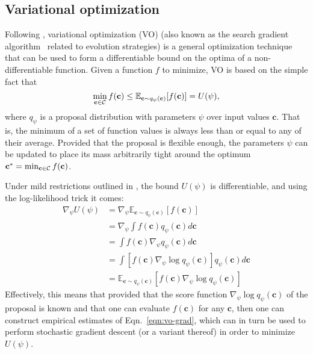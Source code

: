 \documentclass[twocolumn,superscriptaddress,aps]{revtex4-1}
\theoremstyle{plain}
\begin{document}
\subsection{Variational optimization}

Following \citep{2012arXiv1212.4507S}, variational optimization (VO) (also known as the search gradient algorithm~\citep{2011arXiv1106.4487W} related to evolution strategies) is a general
optimization technique that can be used to form a differentiable bound
on the optima of a non-differentiable function. Given a function $f$ to minimize, VO
is based on the simple fact that
\begin{equation}
    \min_{\mathbf{c} \in {\cal C}} f(\mathbf{c}) \leq \mathbb{E}_{\mathbf{c} \sim q_\psi(\mathbf{c})} [f(\mathbf{c})] = U(\psi),
\end{equation}
where $q_\psi$ is a proposal distribution with parameters $\psi$ over input values $\mathbf{c}$.
That is, the minimum of a set of function values is always less than or equal
to any of their average. Provided that the proposal is flexible enough, the parameters $\psi$
can be updated to place its mass arbitrarily tight around the optimum $\mathbf{c}^* = \min_{\mathbf{c} \in {\cal C}} f(\mathbf{c})$.

Under mild restrictions outlined in  \citep{2012arXiv1212.4507S}, the bound $U(\psi)$ is differentiable, and using the log-likelihood trick it comes:
\begin{align}\label{eqn:vo-grad}
    \nabla_\psi U(\psi) &= \nabla_\psi \mathbb{E}_{\mathbf{c} \sim q_\psi(\mathbf{c})} [f(\mathbf{c})] \nonumber \\
    &= \nabla_\psi \int f(\mathbf{c})  q_\psi(\mathbf{c})  d\mathbf{c} \nonumber \\
    &= \int f(\mathbf{c}) \nabla_\psi q_\psi(\mathbf{c})  d\mathbf{c} \nonumber \\
    &= \int \left[ f(\mathbf{c}) \nabla_\psi \log q_\psi(\mathbf{c}) \right]  q_\psi(\mathbf{c})  d\mathbf{c} \nonumber \\
    &= \mathbb{E}_{\mathbf{c} \sim q_\psi(\mathbf{c})} [f(\mathbf{c}) \nabla_\psi \log q_\psi(\mathbf{c})]
\end{align}
Effectively, this means that provided that the score function $\nabla_\psi \log q_\psi(\mathbf{c})$ of the proposal
is known and that one can evaluate $f(\mathbf{\mathbf{c}})$ for any $\mathbf{c}$, then
one can construct empirical estimates of Eqn.~\ref{eqn:vo-grad}, which can
in turn be used to perform stochastic gradient descent (or a variant thereof)
in order to minimize $U(\psi)$.
\end{document}
